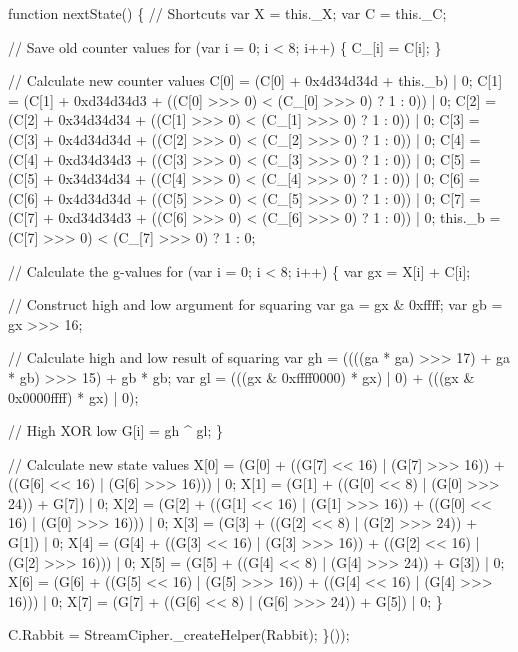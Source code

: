 \begin{DoxyCodeInclude}
    \textcolor{keyword}{function} nextState() \{
        \textcolor{comment}{// Shortcuts}
        var X = this.\_X;
        var C = this.\_C;

        \textcolor{comment}{// Save old counter values}
        \textcolor{keywordflow}{for} (var i = 0; i < 8; i++) \{
            C\_[i] = C[i];
        \}

        \textcolor{comment}{// Calculate new counter values}
        C[0] = (C[0] + 0x4d34d34d + this.\_b) | 0;
        C[1] = (C[1] + 0xd34d34d3 + ((C[0] >>> 0) < (C\_[0] >>> 0) ? 1 : 0)) | 0;
        C[2] = (C[2] + 0x34d34d34 + ((C[1] >>> 0) < (C\_[1] >>> 0) ? 1 : 0)) | 0;
        C[3] = (C[3] + 0x4d34d34d + ((C[2] >>> 0) < (C\_[2] >>> 0) ? 1 : 0)) | 0;
        C[4] = (C[4] + 0xd34d34d3 + ((C[3] >>> 0) < (C\_[3] >>> 0) ? 1 : 0)) | 0;
        C[5] = (C[5] + 0x34d34d34 + ((C[4] >>> 0) < (C\_[4] >>> 0) ? 1 : 0)) | 0;
        C[6] = (C[6] + 0x4d34d34d + ((C[5] >>> 0) < (C\_[5] >>> 0) ? 1 : 0)) | 0;
        C[7] = (C[7] + 0xd34d34d3 + ((C[6] >>> 0) < (C\_[6] >>> 0) ? 1 : 0)) | 0;
        this.\_b = (C[7] >>> 0) < (C\_[7] >>> 0) ? 1 : 0;

        \textcolor{comment}{// Calculate the g-values}
        \textcolor{keywordflow}{for} (var i = 0; i < 8; i++) \{
            var gx = X[i] + C[i];

            \textcolor{comment}{// Construct high and low argument for squaring}
            var ga = gx & 0xffff;
            var gb = gx >>> 16;

            \textcolor{comment}{// Calculate high and low result of squaring}
            var gh = ((((ga * ga) >>> 17) + ga * gb) >>> 15) + gb * gb;
            var gl = (((gx & 0xffff0000) * gx) | 0) + (((gx & 0x0000ffff) * gx) | 0);

            \textcolor{comment}{// High XOR low}
            G[i] = gh ^ gl;
        \}

        \textcolor{comment}{// Calculate new state values}
        X[0] = (G[0] + ((G[7] << 16) | (G[7] >>> 16)) + ((G[6] << 16) | (G[6] >>> 16))) | 0;
        X[1] = (G[1] + ((G[0] << 8)  | (G[0] >>> 24)) + G[7]) | 0;
        X[2] = (G[2] + ((G[1] << 16) | (G[1] >>> 16)) + ((G[0] << 16) | (G[0] >>> 16))) | 0;
        X[3] = (G[3] + ((G[2] << 8)  | (G[2] >>> 24)) + G[1]) | 0;
        X[4] = (G[4] + ((G[3] << 16) | (G[3] >>> 16)) + ((G[2] << 16) | (G[2] >>> 16))) | 0;
        X[5] = (G[5] + ((G[4] << 8)  | (G[4] >>> 24)) + G[3]) | 0;
        X[6] = (G[6] + ((G[5] << 16) | (G[5] >>> 16)) + ((G[4] << 16) | (G[4] >>> 16))) | 0;
        X[7] = (G[7] + ((G[6] << 8)  | (G[6] >>> 24)) + G[5]) | 0;
    \}

    C.Rabbit = StreamCipher.\_createHelper(Rabbit);
\}());
\end{DoxyCodeInclude}
 
